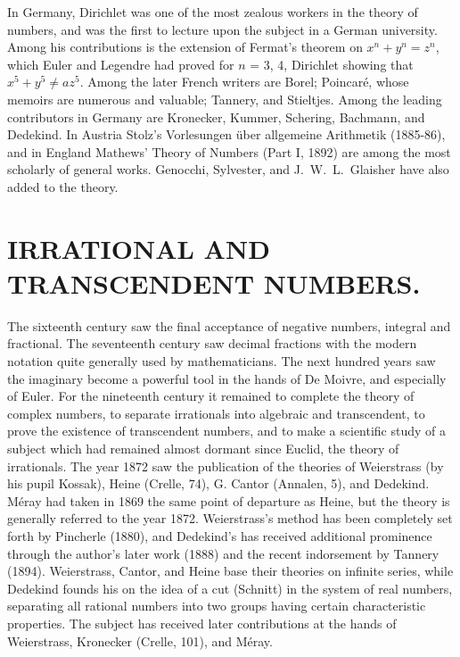 \documentclass[oneside]{book}
\begin{document}
In Germany, Dirichlet was one of the most zealous workers in the
theory of numbers, and was the first to lecture upon the subject in
a German university. Among his contributions is the extension of
Fermat's theorem on $x^n+y^n=z^n$, which Euler and Legendre had proved
for $n$ = 3, 4, Dirichlet showing that $x^5+y^5 \neq az^5$. Among
the later French writers are Borel; Poincar\'e, whose memoirs are
numerous and valuable; Tannery, and Stieltjes. Among the leading
contributors in Germany are Kronecker, Kummer, Schering, Bachmann,
and Dedekind. In Austria Stolz's Vorlesungen \"uber allgemeine
Arithmetik (1885-86), and in England Mathews' Theory of Numbers
(Part I, 1892) are among the most scholarly of general works.
Genocchi, Sylvester, and J.~W.~L.~Glaisher have also added to the
theory.

\chapter{IRRATIONAL AND TRANSCENDENT NUMBERS.}

The sixteenth century saw the final acceptance of negative numbers,
integral and fractional. The seventeenth century saw decimal
fractions with the modern notation quite generally used by
mathematicians. The next hundred years saw the imaginary become a
powerful tool in the hands of De Moivre, and especially of
Euler. For the nineteenth century it remained to complete the
theory of complex numbers, to separate irrationals into algebraic
and transcendent, to prove the existence of transcendent numbers,
and to make a scientific study of a subject which had remained
almost dormant since Euclid, the theory of irrationals. The year
1872 saw the publication of the theories of Weierstrass (by his
pupil Kossak), Heine (Crelle, 74), G. Cantor (Annalen, 5), and
Dedekind. M\'eray had taken in 1869 the same point of departure as
Heine, but the theory is generally referred to the year
1872. Weierstrass's method has been completely set forth by
Pincherle (1880), and Dedekind's has received additional prominence
through the author's later work (1888) and the recent indorsement by
Tannery (1894). Weierstrass, Cantor, and Heine base their theories
on infinite series, while Dedekind founds his on the idea of a cut
(Schnitt) in the system of real numbers, separating all rational
numbers into two groups having certain characteristic
properties. The subject has received later contributions at the
hands of Weierstrass, Kronecker (Crelle, 101), and M\'eray.
\end{document}
